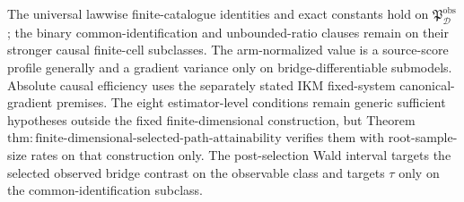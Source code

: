 The universal lawwise finite-catalogue identities and exact constants hold on \(\mathfrak P_{\mathcal D}^{\mathrm{obs}}\); the binary common-identification and unbounded-ratio clauses remain on their stronger causal finite-cell subclasses.  The arm-normalized value is a source-score profile generally and a gradient variance only on bridge-differentiable submodels.  Absolute causal efficiency uses the separately stated IKM fixed-system canonical-gradient premises.  The eight estimator-level conditions remain generic sufficient hypotheses outside the fixed finite-dimensional construction, but Theorem~\(\mathrm{thm{:}finite\text{-}dimensional\text{-}selected\text{-}path\text{-}attainability}\) verifies them with root-sample-size rates on that construction only.  The post-selection Wald interval targets the selected observed bridge contrast on the observable class and targets \(\tau\) only on the common-identification subclass.
